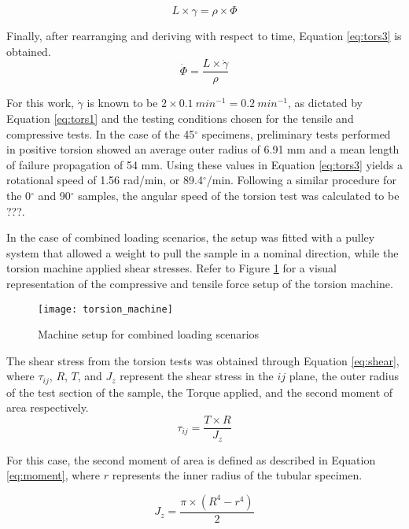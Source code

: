 \documentclass[main.tex]{subfiles}
\begin{document}
\begin{equation}\label{eq:tors2}
L\times \gamma= \rho \times \Phi  
\end{equation}

Finally, after rearranging and deriving with respect to time, Equation \ref{eq:tors3} is obtained.
\begin{equation}\label{eq:tors3}
\dot{\Phi}=\frac{L\times\dot{\gamma}}{\rho}  
\end{equation}

For this work, $\dot{\gamma}$ is known to be $2 \times 0.1~min^{-1}= 0.2~min^{-1}$, as dictated by Equation \ref{eq:tors1} and the testing conditions chosen for the tensile and compressive tests. In the case of the 45$^\circ$ specimens, preliminary tests performed in positive torsion showed an average outer radius of 6.91 mm and a mean length of failure propagation of 54 mm. Using these values in Equation \ref{eq:tors3} yields a rotational speed of 1.56 rad/min, or 89.4$^\circ$/min. Following a similar procedure for the 0$^\circ$ and 90$^\circ$ samples, the angular speed of the torsion test was calculated to be ???.

In the case of combined loading scenarios, the setup was fitted with a pulley system that allowed a weight to pull the sample in a nominal direction, while the torsion machine applied shear stresses. Refer to Figure \ref{fig:torscomb} for a visual representation of the compressive and tensile force setup of the torsion machine. 

\begin{figure}[h]
	\center
	\texttt{[image: torsion\_machine]}
	\caption{Machine setup for combined loading scenarios} \label{fig:torscomb}
\end{figure}

The shear stress from the torsion tests was obtained through Equation \ref{eq:shear}, where $\tau_{ij}$, $R$, $T$, and $J_{z}$ represent the shear stress in the $ij$\texttt{} plane, the outer radius of the test section of the sample, the Torque applied, and the second moment of area respectively.
\begin{equation}\label{eq:shear}
\tau_{ij}=\frac{T\times R}{J_{z}}  
\end{equation}

For this case, the second moment of area is defined as described in Equation \ref{eq:moment}, where $r$ represents the inner radius of the tubular specimen.

\begin{equation}\label{eq:moment}
J_{z}=\frac{\pi\times (R^4-r^4)}{2}  
\end{equation}
\end{document}
